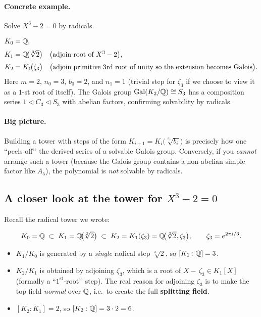 \documentclass[12pt]{article}
\theoremstyle{definition} %
\theoremstyle{plain} %
\begin{document}
\paragraph{Concrete example.}
Solve $X^3-2=0$ by radicals.

\[
   \begin{aligned}
      K_0 &= \Bbb Q, \\[2pt]
      K_1 &= \Bbb Q\!\bigl(\sqrt[3]{2}\bigr) 
            \quad\bigl(\text{adjoin root of }X^3-2\bigr), \\[2pt]
      K_2 &= K_1\!\bigl(\zeta_3\bigr)
            \quad\bigl(\text{adjoin primitive $3$rd root of unity
                      so the extension becomes Galois}\bigr).
   \end{aligned}
\]
Here $m=2$, $n_0=3$, $b_0=2$, and $n_1=1$ (trivial step for $\zeta_3$ if
we choose to view it as a $1$-st root of itself).  
The Galois group
$\operatorname{Gal}(K_2/\Bbb Q)\cong S_3$ has a composition series
$1\lhd C_3\lhd S_3$ with abelian factors, confirming solvability by
radicals.

\paragraph{Big picture.}
Building a tower with steps of the form
\(
   K_{i+1}=K_i\bigl(\sqrt[n_i]{b_i}\bigr)
\)
is precisely how one “peels off’’ the derived series of a solvable
Galois group.  
Conversely, if you \emph{cannot} arrange such a tower (because the
Galois group contains a non-abelian simple factor like $A_5$), the
polynomial is \emph{not} solvable by radicals.
\subsection*{A closer look at the tower for $X^{3}-2=0$}

Recall the radical tower we wrote:

\[
   K_0=\Bbb Q
   \;\subset\;
   K_1=\Bbb Q\!\bigl(\sqrt[3]{2}\bigr)
   \;\subset\;
   K_2=K_1(\zeta_3)
        =\Bbb Q\!\bigl(\sqrt[3]{2},\zeta_3\bigr),
   \qquad
   \zeta_3=e^{2\pi i/3}.
\]

\begin{itemize}
   \item $K_1/K_0$ is generated by a \emph{single} radical step
         $\sqrt[3]{2}$, so $[K_1:\Bbb Q]=3$.
   \item $K_2/K_1$ is obtained by adjoining $\zeta_3$, which is a root
         of $X-\,\zeta_3\in K_1[X]$ (formally a “$1^{\text{st}}$‐root’’
         step).  
         The real reason for adjoining $\zeta_3$ is to make the top
         field \emph{normal} over $\Bbb Q$, i.e.\ to create the full
         \textbf{splitting field}.
   \item $[K_2:K_1]=2$, so $[K_2:\Bbb Q]=3\cdot2=6$.
\end{itemize}
\end{document}
